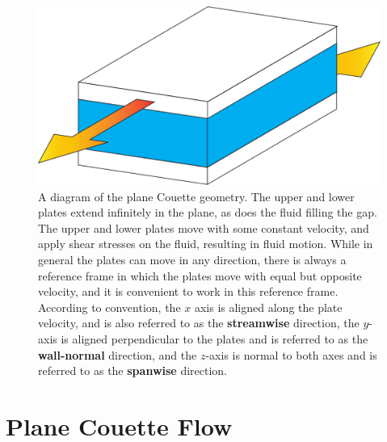\begin{figure}
\centerline{
\includegraphics[scale=0.4]{Figs/planeCouetteDiagram}}
\caption{A diagram of the plane Couette geometry. The upper and lower plates extend infinitely in the plane, as does the fluid filling the gap. The upper and lower plates move with some constant velocity, and apply shear stresses on the fluid, resulting in fluid motion. While in general the plates can move in any direction, there is always a reference frame in which the plates move with equal but opposite velocity, and it is convenient to work in this reference frame. According to convention, the $x$ axis is aligned along the plate velocity, and is also referred to as the {\bf streamwise} direction, the $y$-axis is aligned perpendicular to the plates and is referred to as the {\bf wall-normal} direction, and the $z$-axis is normal to both axes and is referred to as the {\bf spanwise} direction.}\label{fig:planeCouette}
\end{figure}

\section{Plane Couette Flow} 


